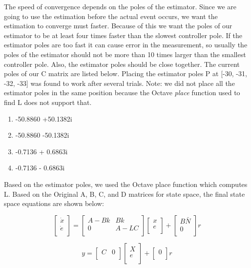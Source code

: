 \documentclass{article}
\begin{document}
The speed of convergence depends on the poles of the estimator. Since we are going to use the estimation before the actual event occurs, we want the estimation to converge must faster. Because of this we want the poles of our estimator to be at least four times faster than the slowest controller pole. If the estimator poles are too fast it can cause error in the measurement, so usually the poles of the estimator should not be more than 10 times larger than the smallest controller pole. Also, the estimator poles should be close together. The current poles of our C matrix are listed below. Placing the estimator poles P at [-30, -31, -32, -33] was found to work after several trials. Note: we did not place all the estimator poles in the same position because the Octave \textit{place} function used to find L does not support that.
\begin{enumerate}
  \item  -50.8860 +50.1382i
  \item -50.8860 -50.1382i
  \item -0.7136 + 0.6863i
  \item -0.7136 - 0.6863i
\end{enumerate}

Based on the estimator poles, we used the Octave place function which computes L. Based on the Original A, B, C, and D matrices for state space, the final state space equations are shown below:

\begin{equation}
\label{ss3}
\begin{bmatrix}
\dot{x}\\
\dot{e}\\
\end{bmatrix}
=
\begin{bmatrix}
A-Bk&Bk\\
0&A-LC\\
\end{bmatrix}
\begin{bmatrix}
x\\
e\\
\end{bmatrix} +
\begin{bmatrix}
B\bar{N}\\
0\\
\end{bmatrix} r
\end{equation}

\begin{equation}
\label{ss4}
y = 
\begin{bmatrix}
C&0\\
\end{bmatrix}
\begin{bmatrix}
X\\
e\\
\end{bmatrix} +
\begin{bmatrix}
0\\
\end{bmatrix} r
\end{equation}
\end{document}
